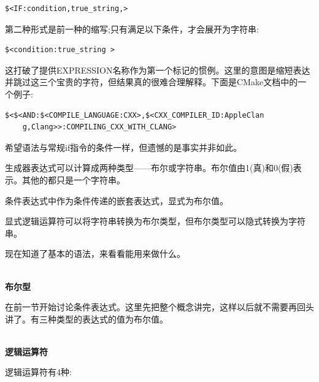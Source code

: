 \begin{lstlisting}[style=styleCMake]
$<IF:condition,true_string,>
\end{lstlisting}

第二种形式是前一种的缩写;只有满足以下条件，才会展开为字符串:

\begin{lstlisting}[style=styleCMake]
$<condition:true_string >
\end{lstlisting}

这打破了提供EXPRESSION名称作为第一个标记的惯例。这里的意图是缩短表达并跳过这三个宝贵的字符，但结果真的很难合理解释。下面是CMake文档中的一个例子:

\begin{lstlisting}[style=styleCMake]
$<$<AND:$<COMPILE_LANGUAGE:CXX>,$<CXX_COMPILER_ID:AppleClan
	g,Clang>>:COMPILING_CXX_WITH_CLANG>
\end{lstlisting}

希望语法与常规if指令的条件一样，但遗憾的是事实并非如此。


生成器表达式可以计算成两种类型——布尔或字符串。布尔值由1(真)和0(假)表示。其他的都只是一个字符串。

条件表达式中作为条件传递的嵌套表达式，显式为布尔值。

显式逻辑运算符可以将字符串转换为布尔类型，但布尔类型可以隐式转换为字符串。

现在知道了基本的语法，来看看能用来做什么。

\hspace*{\fill} \\ %
\noindent
\textbf{布尔型}

在前一节开始讨论条件表达式。这里先把整个概念讲完，这样以后就不需要再回头讲了。有三种类型的表达式的值为布尔值。

\hspace*{\fill} \\ %
\noindent
\textbf{逻辑运算符}

逻辑运算符有4种:

